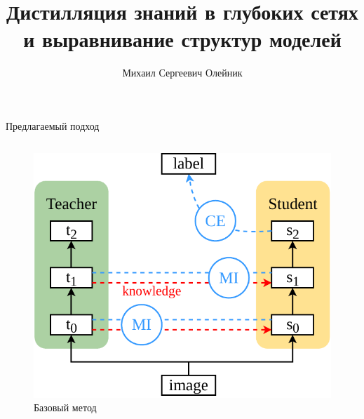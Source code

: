 \documentclass{beamer}
\title[\hbox to 56mm{Дистилляция знаний в глубоких сетях}]{Дистилляция знаний в глубоких сетях и выравнивание структур моделей}
\author[М.\,С.~Олейник]{Михаил Сергеевич Олейник}
\institute{Московский физико-технический институт}
\date{\footnotesize
\par\smallskip\emph{Курс:} Моя первая научная статья
\par\smallskip\emph{Консультант:} М. Горпинич
\par\bigskip\small 2023}
\begin{document}

\begin{frame}

    \maketitle

\end{frame}


\begin{frame}{Предлагаемый подход}

    \begin{columns}[c]
        \begin{figure}
            \includegraphics[width=1.0\textwidth]{ahn_diagram.pdf}
            \caption{Базовый метод}
        \end{figure}


\end{columns}
\end{frame}
\end{document}
